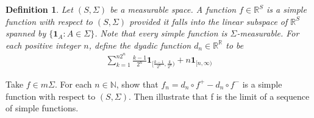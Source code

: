 \documentclass[a4paper, linespread=1.5]{article}
\newtheorem{definition}[theorem]{Definition}
\begin{document}
	\begin{definition}
		Let $(S,\Sigma)$ be a measurable space. A function $f\in \mathbb{R}^S$ is a simple function with respect to $(S,\Sigma)$ provided it falls into the linear subspace of $\mathbb{R}^S$ spanned by  $\{\mathbf{1}_{A}:A\in \Sigma\}$. Note that every simple function is $\Sigma$-measurable. For each positive integer $n$, define the dyadic function $d_n\in \mathbb{R}^\mathbb{R}$ to be 
		\begin{align*}
			\sum\limits_{k=1}^{n2^n}\frac{k-1}{2^n}\mathbf{1}_{[\frac{k-1}{2^n},\frac{k}{2^n})}+n\mathbf{1}_{[n,\infty)}
		\end{align*}
	\end{definition}
	\begin{customex}{10}
		Take $f\in m\Sigma$. For each $n \in \mathbb{N}$, show that $f_{n}=d_{n}\circ f^{+}-d_{n}\circ f^{-}$ is a simple function with respect to $(S,\Sigma)$. Then illustrate that f is the limit of a sequence of simple functions.
	\end{customex}
\end{document}
